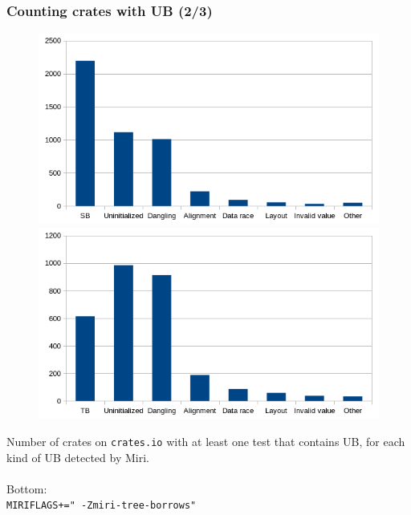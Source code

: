 \begin{frame}
    \frametitle{Counting crates with UB (2/3)}
    \begin{minipage}{0.55\textwidth}
        \begin{figure}
            \includegraphics[width=\textwidth]{../img/sb-count.png}
            \includegraphics[width=\textwidth]{../img/tb-count.png}
        \end{figure}
    \end{minipage}
    \begin{minipage}{0.42\textwidth}
        {\footnotesize Number of crates on \texttt{crates.io} with at least one test
        that contains UB, for each kind of UB detected by Miri.}\\~\\
        {\tiny Bottom: \\\texttt{MIRIFLAGS+=" -Zmiri-tree-borrows"}}
    \end{minipage}
\end{frame}


